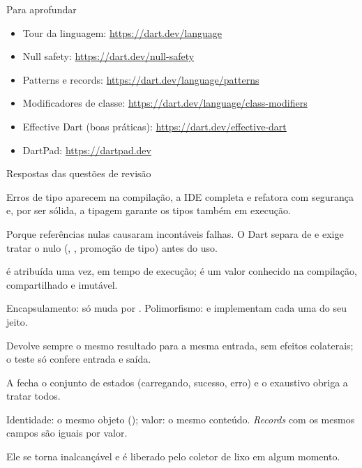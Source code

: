 \documentclass[aspectratio=169,10pt]{beamer}
\begin{document}
\begin{frame}{Para aprofundar}
  \small
  \begin{itemize}
    \item Tour da linguagem: \url{https://dart.dev/language}
    \item Null safety: \url{https://dart.dev/null-safety}
    \item Patterns e records: \url{https://dart.dev/language/patterns}
    \item Modificadores de classe: \url{https://dart.dev/language/class-modifiers}
    \item Effective Dart (boas práticas): \url{https://dart.dev/effective-dart}
    \item DartPad: \url{https://dartpad.dev}
  \end{itemize}
\end{frame}

\begin{frame}{Respostas das questões de revisão}
  \begin{respostas}
    \item Erros de tipo aparecem na compilação, a IDE completa e refatora com segurança e, por ser sólida, a tipagem garante os tipos também em execução.
    \item Porque referências nulas causaram incontáveis falhas. O Dart separa  de  e exige tratar o nulo (, , promoção de tipo) antes do uso.
    \item {} é atribuída uma vez, em tempo de execução;  é um valor conhecido na compilação, compartilhado e imutável.
    \item Encapsulamento:  só muda por . Polimorfismo:  e  implementam  cada uma do seu jeito.
    \item Devolve sempre o mesmo resultado para a mesma entrada, sem efeitos colaterais; o teste só confere entrada e saída.
    \item A  fecha o conjunto de estados (carregando, sucesso, erro) e o  exaustivo obriga a tratar todos.
    \item Identidade: o mesmo objeto (); valor: o mesmo conteúdo. \emph{Records} com os mesmos campos são iguais por valor.
    \item Ele se torna inalcançável e é liberado pelo coletor de lixo em algum momento.
  \end{respostas}
\end{frame}

\end{document}
